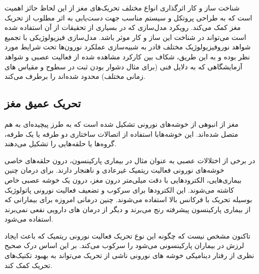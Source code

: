 شناخت ساز و کار اثرگذاری انواع مختلف تحریک‌های مغز از این لحاظ حائز اهمیت است که به طراحی پروتکل و سیستم مناسب جهت دست‌یابی به اثر مطلوب از تحریک مغز کمک می‌کند. رویکرد مدل‌سازی که در بسیاری از تحقیقات از آن استفاده شده است می‌تواند در شناخت این ساز و کار موثر باشد. مدل‌سازی فیزیولوژیکی با تجمیع شواهد نوروفیزیولوژیک مختلف قادر به شبیه‌سازی عملکرد نورون‌ها تحت شرایط مورد نظر بوده و به این طریق، شکاف بین کارکرد مشاهده شده از فعالیت عصبی و شواهد آزمایشگاهی که به دلایل فنی (برای مثال دشوار بودن ثبت در سطوح و مقیاس های زمانی مختلف) محدود شده‌اند را برطرف می‌کند. 


\subsection{تحریک عمیق مغز}

مغز از انبوهی از خوشه‌های نورونی تشکیل شده است که به طرز پیچیده‌ای به هم متصل شده‌اند. این خوشه‌هابا استفاده از اتصالات ساختاری دو طرفه یا یک طرفه، گروه‌ها یا حلقه‌هایی را تشکیل می‌دهند. 

در برخی از اختلالات عصبی به عنوان مثال در بیماری پارکینسون، درون حلقه‌های خاصی خوشه‌های نورونی فعالیت ریتمیک غیرعادی و ناهنجار دارند. برای درمان چنین بیماری‌هایی، الکترودهایی با دقت میلی‌متر درون مغز، درون یک خوشه عصبی خاص کاشته می‌شوند. این الکترودها برای سرکوب و تضعیف فعالیت نورونی پاتولوژیک بوسیله تحریک با فرکانس بالا استفاده می‌شوند. چنین درمانی امروزه برای بیمارانی که از بیماری پارکینسون پیشرفته رنج می‌برند و دیگر از درمان های دارویی نفعی نمی‌برند استفاده می‌شود. 

تاکنون مشخص نیست که چگونه این نوع تحریک فعالیت نورونی ریتمیک که باعث ایجاد لرزش در بیماران پارکینسونی می‌شود را سرکوب می‌کند. بر این اساس درک صحیح نظری از رفتار دینامیکی خوشه های نورونی ناشی از تحریک می‌تواند به بهبود تکنیک‌های تحریک کمک کند.

